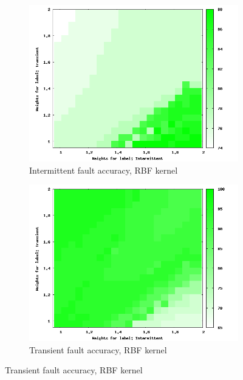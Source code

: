 \begin{figure}
        \begin{subfigure}[h]{0.45\linewidth}
                \includegraphics[scale=0.25]{figures/rbf256i.png}
                \caption{Intermittent fault accuracy, RBF kernel}
        \end{subfigure}
			\begin{subfigure}[h]{0.45\linewidth}
                \includegraphics[scale=0.25]{figures/rbf256t.png}
                \caption{Transient fault accuracy, RBF kernel}
        \end{subfigure}


\end{figure}
